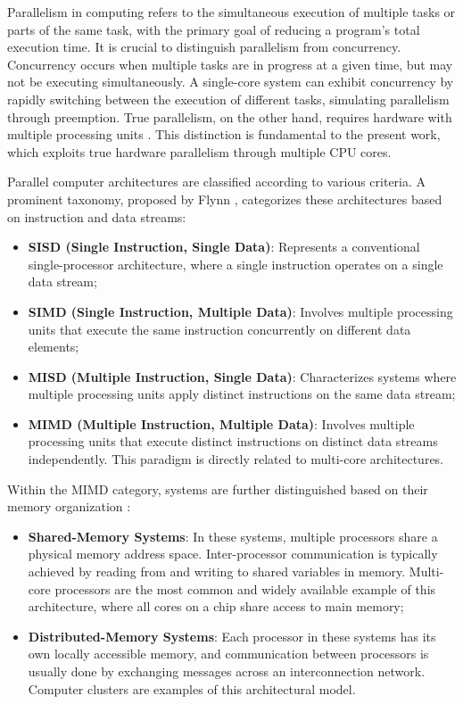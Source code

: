 
Parallelism in computing refers to the simultaneous execution of multiple tasks or parts of the same task, with the primary goal of reducing a program's total execution time. It is crucial to distinguish parallelism from concurrency. Concurrency occurs when multiple tasks are in progress at a given time, but may not be executing simultaneously. A single-core system can exhibit concurrency by rapidly switching between the execution of different tasks, simulating parallelism through preemption. True parallelism, on the other hand, requires hardware with multiple processing units \cite{Butenhof1997}. This distinction is fundamental to the present work, which exploits true hardware parallelism through multiple CPU cores.


Parallel computer architectures are classified according to various criteria. A prominent taxonomy, proposed by Flynn \cite{Flynn1966}, categorizes these architectures based on instruction and data streams:
\begin{itemize}
    \item \textbf{SISD (Single Instruction, Single Data)}: Represents a conventional single-processor architecture, where a single instruction operates on a single data stream;
    \item \textbf{SIMD (Single Instruction, Multiple Data)}: Involves multiple processing units that execute the same instruction concurrently on different data elements;
    \item \textbf{MISD (Multiple Instruction, Single Data)}: Characterizes systems where multiple processing units apply distinct instructions on the same data stream;
    \item \textbf{MIMD (Multiple Instruction, Multiple Data)}:  Involves multiple processing units that execute distinct instructions on distinct data streams independently. This paradigm is directly related to multi-core architectures.
\end{itemize}

Within the MIMD category, systems are further distinguished based on their memory organization \cite{Pacheco2011}:
\begin{itemize}
    \item \textbf{Shared-Memory Systems}: In these systems, multiple processors share a physical memory address space. Inter-processor communication is typically achieved by reading from and writing to shared variables in memory. Multi-core processors are the most common and widely available example of this architecture, where all cores on a chip share access to main memory;
    \item \textbf{Distributed-Memory Systems}: Each processor in these systems has its own locally accessible memory, and communication between processors is usually done by exchanging messages across an interconnection network. Computer clusters are examples of this architectural model.
\end{itemize}

